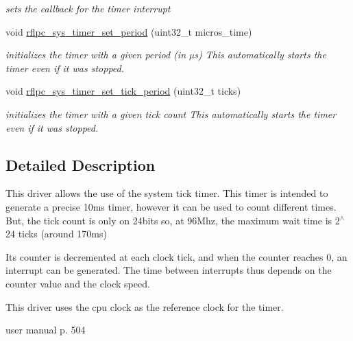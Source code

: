 \begin{DoxyCompactItemize}
\begin{DoxyCompactList}\small\item\em sets the callback for the timer interrupt \end{DoxyCompactList}\item 
\hypertarget{group__systick_ga9a3d1454c6e49c79984085a837fee36e}{void \hyperlink{group__systick_ga9a3d1454c6e49c79984085a837fee36e}{rflpc\-\_\-sys\-\_\-timer\-\_\-set\-\_\-period} (uint32\-\_\-t micros\-\_\-time)}\label{group__systick_ga9a3d1454c6e49c79984085a837fee36e}

\begin{DoxyCompactList}\small\item\em initializes the timer with a given period (in µs) This automatically starts the timer even if it was stopped. \end{DoxyCompactList}\item 
void \hyperlink{group__systick_ga3d2887f774eb4556636f4555727553a3}{rflpc\-\_\-sys\-\_\-timer\-\_\-set\-\_\-tick\-\_\-period} (uint32\-\_\-t ticks)
\begin{DoxyCompactList}\small\item\em initializes the timer with a given tick count This automatically starts the timer even if it was stopped. \end{DoxyCompactList}\end{DoxyCompactItemize}


\subsection{Detailed Description}
This driver allows the use of the system tick timer. This timer is intended to generate a precise 10ms timer, however it can be used to count different times. But, the tick count is only on 24bits so, at 96\-Mhz, the maximum wait time is 2$^\wedge$24 ticks (around 170ms)

Its counter is decremented at each clock tick, and when the counter reaches 0, an interrupt can be generated. The time between interrupts thus depends on the counter value and the clock speed.

This driver uses the cpu clock as the reference clock for the timer.

user manual p. 504 

